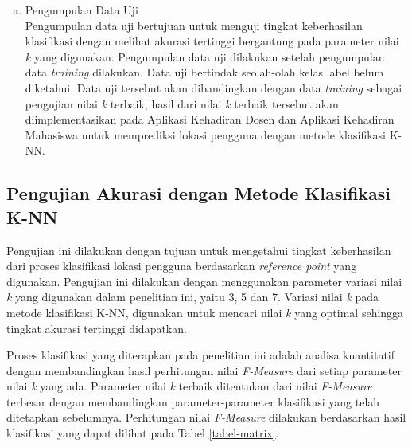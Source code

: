 \begin{enumerate}[a.]
\vspace{3cm}

\item Pengumpulan Data Uji
\\
Pengumpulan data uji bertujuan untuk menguji tingkat keberhasilan klasifikasi dengan melihat akurasi tertinggi bergantung pada parameter nilai \textit{k} yang digunakan. Pengumpulan data uji dilakukan setelah pengumpulan data \textit{training} dilakukan. Data uji bertindak seolah-olah kelas label belum diketahui. Data uji tersebut akan dibandingkan dengan data \textit{training} sebagai pengujian nilai \textit{k} terbaik, hasil dari nilai \textit{k} terbaik tersebut akan diimplementasikan pada Aplikasi Kehadiran Dosen dan Aplikasi Kehadiran Mahasiswa untuk memprediksi lokasi pengguna dengan metode klasifikasi K-NN.

\end{enumerate} 
\subsection{Pengujian Akurasi dengan Metode Klasifikasi K-NN}

\par Pengujian ini dilakukan dengan tujuan untuk mengetahui tingkat keberhasilan dari proses klasifikasi lokasi pengguna berdasarkan \textit{reference point} yang digunakan. Pengujian ini dilakukan dengan menggunakan parameter variasi nilai \textit{k} yang digunakan dalam penelitian ini, yaitu 3, 5 dan 7. Variasi nilai \textit{k} pada metode klasifikasi K-NN, digunakan untuk mencari nilai \textit{k} yang optimal sehingga tingkat akurasi tertinggi didapatkan. 

\par Proses klasifikasi yang diterapkan pada penelitian ini adalah analisa kuantitatif dengan membandingkan hasil perhitungan  nilai \textit{F-Measure} dari setiap parameter nilai \textit{k} yang ada. Parameter nilai \textit{k} terbaik ditentukan dari nilai \textit{F-Measure} terbesar dengan membandingkan parameter-parameter klasifikasi yang telah ditetapkan sebelumnya. Perhitungan nilai \textit{F-Measure} dilakukan berdasarkan hasil klasifikasi yang dapat dilihat pada Tabel \ref{tabel-matrix}.

